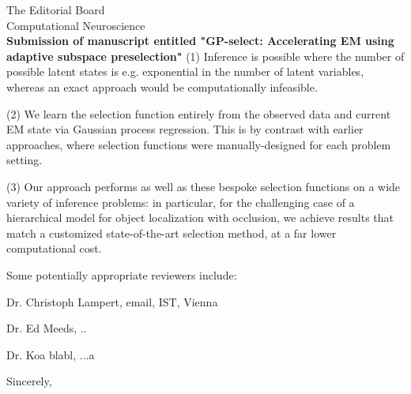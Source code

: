 \documentclass[10pt]{letter}
\begin{document}
\begin{letter}{
The Editorial Board\\
Computational Neuroscience\\
\vspace{10mm}
\textbf{Submission of manuscript entitled "GP-select: Accelerating EM using adaptive
subspace preselection"}
}
(1) Inference is possible where the number of possible latent states is e.g. exponential in the number of latent variables, whereas an exact approach would be computationally infeasible.

(2) We learn the selection function entirely from the observed data and current EM state via Gaussian process regression. This is by contrast with earlier approaches, where selection functions were manually-designed for each problem setting.

(3) Our approach performs as well as these bespoke selection functions on a wide variety of inference problems: in particular, for the challenging case of a hierarchical model for object localization with occlusion, we achieve results that match a customized state-of-the-art selection method, at a far lower computational cost.




Some potentially appropriate reviewers include: 

Dr. Christoph Lampert, email, IST, Vienna

Dr. Ed Meeds, ..

Dr. Koa blabl, ...a


\noindent \vspace{.1in}\closing{Sincerely,\vspace{-5mm}}
\end{letter}
\end{document}
